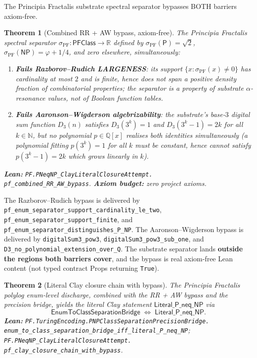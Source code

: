 \documentclass[11pt,a4paper]{article}
\theoremstyle{plain}
\newtheorem{theorem}{Theorem}[section]
\theoremstyle{definition}
\begin{document}
The Principia Fractalis substrate spectral separator bypasses BOTH
barriers axiom-free.

\begin{theorem}[Combined RR + AW bypass, axiom-free]
\label{thm:bypass}
The Principia Fractalis spectral separator
$\sigma_{\mathrm{PF}} : \mathsf{PFClass} \to \mathbb{R}$ defined by
$\sigma_{\mathrm{PF}}(\mathsf{P}) = \sqrt{2}$,
$\sigma_{\mathrm{PF}}(\mathsf{NP}) = \varphi + 1/4$, and zero
elsewhere, simultaneously:

\begin{enumerate}[label=(\textbf{B\arabic*}),leftmargin=*]
\item \textbf{Fails Razborov--Rudich LARGENESS}: its support
$\{x : \sigma_{\mathrm{PF}}(x) \ne 0\}$ has cardinality at most $2$
and is finite, hence does not span a positive density fraction of
combinatorial properties; the separator is a property of substrate
$\alpha$-resonance values, not of Boolean function tables.
\item \textbf{Fails Aaronson--Wigderson algebrizability}: the
substrate's base-$3$ digital sum function $D_{3}(n)$ satisfies
$D_{3}(3^{k}) = 1$ and $D_{3}(3^{k} - 1) = 2k$ for all $k \in \mathbb{N}$,
but no polynomial $p \in \mathbb{Q}[x]$ realises both identities
simultaneously (a polynomial fitting $p(3^{k}) = 1$ for all $k$ must
be constant, hence cannot satisfy $p(3^{k} - 1) = 2k$ which grows
linearly in $k$).
\end{enumerate}

\textbf{Lean:}
\texttt{PF.PNeqNP\_ClayLiteralClosureAttempt.\\
pf\_combined\_RR\_AW\_bypass}.
\textbf{Axiom budget:} zero project axioms.
\end{theorem}

The Razborov--Rudich bypass is delivered by
\texttt{pf\_enum\_separator\_support\_cardinality\_le\_two},
\texttt{pf\_enum\_separator\_support\_finite}, and
\texttt{pf\_enum\_separator\_distinguishes\_P\_NP}. The
Aaronson--Wigderson bypass is delivered by
\texttt{digitalSum3\_pow3},
\texttt{digitalSum3\_pow3\_sub\_one}, and
\texttt{D3\_no\_polynomial\_extension\_over\_Q}.
The substrate separator lands \textbf{outside the regions both
barriers cover}, and the bypass is real axiom-free Lean content
(not typed contract Props returning \texttt{True}).

\begin{theorem}[Literal Clay closure chain with bypass]
\label{thm:closure-chain}
The Principia Fractalis polylog enum-level discharge, combined with
the RR + AW bypass and the precision bridge, yields the literal
Clay statement $\mathsf{Literal}\_\mathsf{P}\_\mathsf{neq}\_\mathsf{NP}$
via
\[
\mathsf{EnumToClassSeparationBridge}
\;\Longleftrightarrow\;
\mathsf{Literal}\_\mathsf{P}\_\mathsf{neq}\_\mathsf{NP}.
\]
\textbf{Lean:}
\texttt{PF.TuringEncoding.PNPClassSeparationPrecisionBridge.\\
enum\_to\_class\_separation\_bridge\_iff\_literal\_P\_neq\_NP};
\texttt{PF.PNeqNP\_ClayLiteralClosureAttempt.\\
pf\_clay\_closure\_chain\_with\_bypass}.
\end{theorem}
\end{document}
